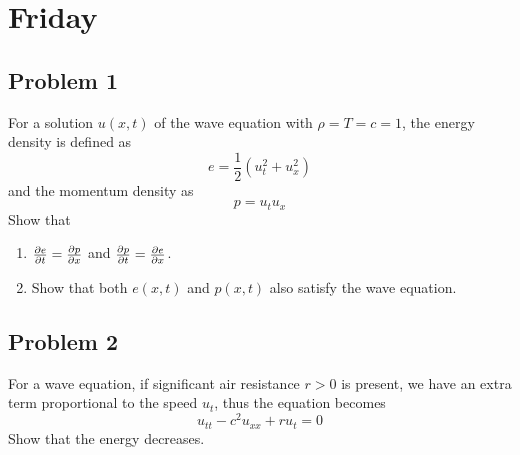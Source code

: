 \documentclass{ben}
\begin{document}
\section{Friday}
\subsection{Problem 1}
For a solution $u(x, t)$ of the wave equation with $\rho = T = c = 1$, the energy density is defined
as
\[
    e = \frac{1}{2} \left( u_t^2 + u_x^2 \right)
\]
and the momentum density as
\[
    p = u_t u_x
\]
Show that
\begin{enumerate}
    \item $\partials[e]{t} = \partials[p]{x}$ and $\partials[p]{t} = \partials[e]{x}$.
    \item Show that both $e(x, t)$ and $p(x, t)$ also satisfy the wave equation.
\end{enumerate}
\subsection{Problem 2}
For a wave equation, if significant air resistance $r > 0$ is present, we have an extra term
proportional to the speed $u_t$, thus the equation becomes
\[
    u_{tt} - c^2 u_{xx} + r u_t = 0
\]
Show that the energy decreases.
\end{document}
